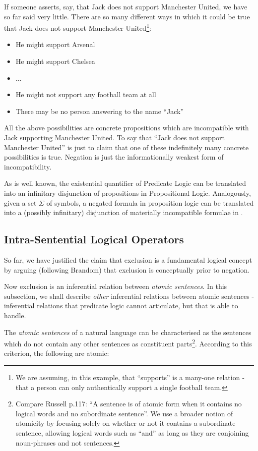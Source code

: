 If someone asserts, say, that Jack does not support Manchester United, we have so far said very little.  
There are so many different ways in which it could be true that Jack does not support Manchester United\footnote{We are assuming, in this example, that ``supports'' is a many-one relation - that a person can only authentically support a single football team.}:
\begin{itemize}
\item
He might support Arsenal
\item
He might support Chelsea
\item
...
\item
He might not support any football team at all
\item
There may be no person answering to the name ``Jack''
\end{itemize}
All the above possibilities are concrete propositions which are incompatible with Jack supporting Manchester United.
To say that ``Jack does not support Manchester United'' is just to claim that one of these indefinitely many concrete possibilities is true.
Negation is just the informationally weakest form of incompatibility.

As is well known, the existential quantifier of Predicate Logic can be translated into an infinitary disjunction of propositions in Propositional Logic.
Analogously, given a set $\Sigma$ of symbols, a negated formula in proposition logic can be translated into a (possibly infinitary)
disjunction of materially incompatible formulae in \ELFULL{}.

\subsection{Intra-Sentential Logical Operators}

So far, we have justified the claim that exclusion is a fundamental logical concept by arguing (following Brandom) that exclusion is conceptually prior to negation. 

Now exclusion is an inferential relation between \emph{atomic sentences}. 
In this subsection, we shall describe \emph{other} inferential relations between atomic sentences - inferential relations that predicate logic cannot articulate, but that \ELFULL{} is able to handle.

The \emph{atomic sentences} of a natural language can be
characterised as the sentences which do not contain any other
sentences as constituent parts\footnote{Compare Russell \cite{russell}
  p.117: ``A sentence is of atomic form when it contains no logical
  words and no subordinate sentence''. We use a broader notion of
  atomicity by focusing solely on whether or not it contains a
  subordinate sentence, allowing logical words such as ``and'' as long
  as they are conjoining noun-phrases and not sentences.}.  According
to this criterion, the following are atomic:


